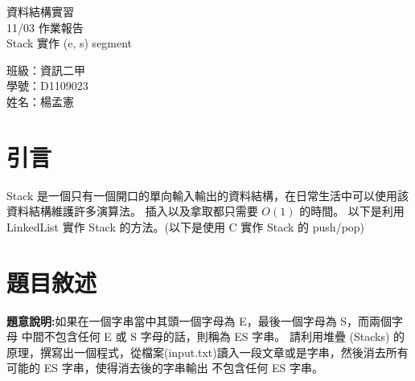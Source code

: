 \documentclass[12pt, a4paper]{article}
\begin{document}
  \begin{center}
    {\Huge 資料結構實習} \\[2.5cm]
    {\Huge 11/03 作業報告} \\[1.5cm]
    {\Huge Stack 實作 (e, s) segment} \\ [4.5cm]
    \hspace{.6in}
    \begin{minipage}[t]{.4\linewidth}
      {\Large 班級：資訊二甲}\\[0.5cm]
      {\Large 學號：D1109023}\\[0.5cm]
      {\Large 姓名：楊孟憲}
    \end{minipage}    
  \end{center}

  \newpage

  \begin{samepage}
    \fontsize{16pt}{18pt} \selectfont  
    \tableofcontents
    \normalfont
  \end{samepage}
  
  \newpage


  \section{\fontsize{20pt}{22pt}\selectfont 引言}
  \begin{samepage}
    \fontsize{16pt}{18pt} \selectfont
      Stack 是一個只有一個開口的單向輸入輸出的資料結構，在日常生活中可以使用該資料結構維護許多演算法。
      插入以及拿取都只需要 $O(1)$ 的時間。 以下是利用 LinkedList 實作 Stack 的方法。(以下是使用 C 實作 Stack 的 push/pop)
      
  \end{samepage}


  \section{\fontsize{20pt}{22pt}\selectfont 題目敘述}
  \begin{samepage}
    \fontsize{16pt}{18pt} \selectfont
        \textbf{題意說明:}如果在一個字串當中其頭一個字母為 E，最後一個字母為 S，而兩個字母 中間不包含任何 E 或 S
        字母的話，則稱為 ES 字串。
        請利用堆疊 (Stacks) 的原理，撰寫出一個程式，從檔案(input.txt)讀入一段文章或是字串，然後消去所有
        可能的 ES 字串，使得消去後的字串輸出 不包含任何 ES 字串。
  \end{samepage}
\end{document}

